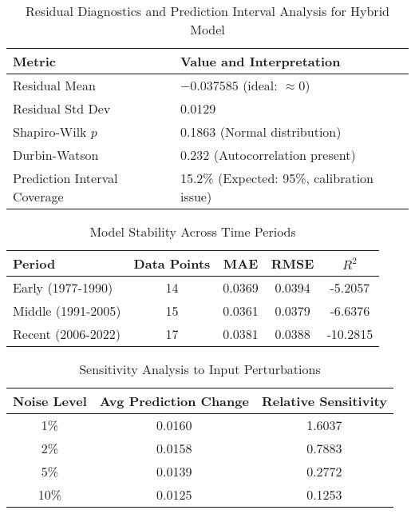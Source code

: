 \vspace{0.3cm}

\begin{table}[H]
\centering
\small
\caption{Residual Diagnostics and Prediction Interval Analysis for Hybrid Model}
\label{tab:residual_diag}
\begin{tabular}{|l|l|}
\hline
\textbf{Metric} & \textbf{Value and Interpretation} \\
\hline
Residual Mean       & $-0.037585$ (ideal: $\approx 0$) \\
Residual Std Dev    & 0.0129 \\
Shapiro-Wilk $p$    & 0.1863 (Normal distribution) \\
Durbin-Watson       & 0.232 (Autocorrelation present) \\
Prediction Interval Coverage & 15.2\% (Expected: 95\%, calibration issue) \\
\hline
\end{tabular}
\end{table}

\vspace{0.3cm} 

\begin{table}[H]
\centering
\small
\caption{Model Stability Across Time Periods}
\label{tab:stability}
\begin{tabular}{|l|c|c|c|c|}
\hline
\textbf{Period} & \textbf{Data Points} & \textbf{MAE} & \textbf{RMSE} & \textbf{\( R^2 \)} \\
\hline
Early (1977-1990) & 14 & 0.0369 & 0.0394 & -5.2057 \\
Middle (1991-2005) & 15 & 0.0361 & 0.0379 & -6.6376 \\
Recent (2006-2022) & 17 & 0.0381 & 0.0388 & -10.2815 \\
\hline
\end{tabular}
\end{table}

\vspace{0.3cm} 

\begin{table}[H]
\centering
\small
\caption{Sensitivity Analysis to Input Perturbations}
\label{tab:sensitivity}
\begin{tabular}{|c|c|c|}
\hline
\textbf{Noise Level} & \textbf{Avg Prediction Change} & \textbf{Relative Sensitivity} \\
\hline
1\%   & 0.0160 & 1.6037 \\
2\%   & 0.0158 & 0.7883 \\
5\%   & 0.0139 & 0.2772 \\
10\%  & 0.0125 & 0.1253 \\
\hline
\end{tabular}
\end{table}

